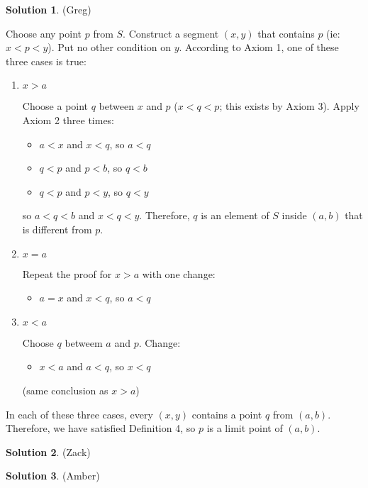\documentclass{article}
\theoremstyle{definition}
\newtheorem{solution}{Solution}
\begin{document}
\begin{solution} %
(Greg)

Choose any point $p$ from $S$.
Construct a segment $(x, y)$ that contains $p$ (ie: $x < p < y$).
Put no other condition on $y$.
According to Axiom 1, one of these three cases is true:

\begin{enumerate}
\item 
$x > a$

Choose a point $q$ between $x$ and $p$ ($x < q < p$; this exists by Axiom 3).
Apply Axiom 2 three times:
\begin{itemize}
\item $a < x$ and $x < q$, so $a < q$
\item $q < p$ and $p < b$, so $q < b$
\item $q < p$ and $p < y$, so $q < y$
\end{itemize}

so $a < q < b$ and $x < q < y$.
Therefore, $q$ is an element of $S$ inside $(a, b)$ that is different from $p$.

\item
$x = a$

Repeat the proof for $x > a$ with one change:

\begin{itemize}
\item $a = x$ and $x < q$, so $a < q$
\end{itemize}

\item
$x < a$

Choose $q$ betweem $a$ and $p$.
Change:

\begin{itemize}
\item $x < a$ and $a < q$, so $x < q$
\end{itemize}

(same conclusion as $x > a$)
\end{enumerate}

In each of these three cases, every $(x,y)$ contains a point $q$ from $(a, b)$.
Therefore, we have satisfied Definition 4, so $p$ is a limit point of $(a, b)$.

\end{solution}

\begin{solution} %
(Zack)
\end{solution}

\begin{solution} %
(Amber)

\end{solution}
\end{document}
